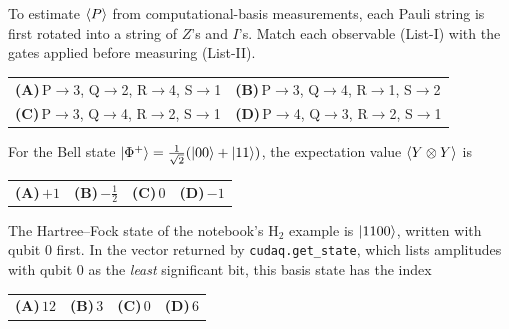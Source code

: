 \documentclass[11pt,a4paper]{article}
\newcommand{\optlabel}[1]{\textbf{(#1)}}
\newenvironment{qitem}[1]{\begin{list}{}{\setlength{\leftmargin}{3.3em}\setlength{\labelwidth}{3.1em}%
  \setlength{\labelsep}{0.2em}\setlength{\topsep}{3pt}\setlength{\parsep}{3pt}}\item[\textbf{Q.#1}\hfill]}{\end{list}}
\newcommand{\qsep}{\par\vspace{2pt}{\color{black!15}\hrule}\vspace{4pt}}
\begin{document}
\begin{qitem}{24}
To estimate $\braket P$ from computational-basis measurements, each Pauli string is first rotated into a string of $Z$'s and $I$'s. Match each
observable (List-I) with the gates applied before measuring (List-II).
\par\smallskip{}
\par\smallskip\noindent\begin{tabularx}{\linewidth}{@{}*{2}{L}@{}}
\optlabel{A}\,P$\to$3, Q$\to$2, R$\to$4, S$\to$1 & \optlabel{B}\,P$\to$3, Q$\to$4, R$\to$1, S$\to$2 \\[3pt]
\optlabel{C}\,P$\to$3, Q$\to$4, R$\to$2, S$\to$1 & \optlabel{D}\,P$\to$4, Q$\to$3, R$\to$2, S$\to$1
\end{tabularx}
\end{qitem}
\qsep

\begin{qitem}{25}
For the Bell state $\ket{\Phi^+} = \tfrac{1}{\sqrt2}(\ket{00} + \ket{11})$, the expectation value $\braket{Y\otimes Y}$ is
\par\smallskip\noindent\begin{tabularx}{\linewidth}{@{}*{4}{L}@{}}
\optlabel{A}\,$+1$ & \optlabel{B}\,$-\tfrac12$ & \optlabel{C}\,$0$ & \optlabel{D}\,$-1$
\end{tabularx}
\end{qitem}
\qsep

\begin{qitem}{26}
The Hartree--Fock state of the notebook's H$_2$ example is $\ket{1100}$, written with qubit 0 first. In the vector returned by \texttt{cudaq.get\_state},
which lists amplitudes with qubit 0 as the \emph{least} significant bit, this basis state has the index
\par\smallskip\noindent\begin{tabularx}{\linewidth}{@{}*{4}{L}@{}}
\optlabel{A}\,$12$ & \optlabel{B}\,$3$ & \optlabel{C}\,$0$ & \optlabel{D}\,$6$
\end{tabularx}
\end{qitem}
\qsep
\end{document}

